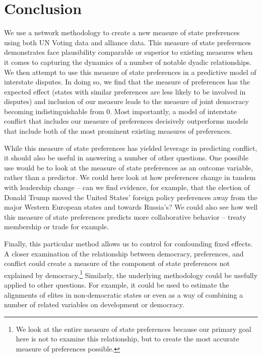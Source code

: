 \section*{Conclusion}

We use a network methodology to create a new measure of state preferences using both UN Voting data and alliance data. This measure of state preferences demonstrates face plausibility comparable or superior to existing measures when it comes to capturing the dynamics of a number of notable dyadic relationships. We then attempt to use this measure of state preferences in a predictive model of interstate disputes. In doing so, we find that the measure of preferences has the expected effect (states with similar preferences are less likely to be involved in disputes) and inclusion of our measure leads to the measure of joint democracy becoming indistinguishable from $0$. Most importantly, a model of interstate conflict that includes our measure of preferences decisively outperforms models that include both of the most prominent existing measures of preferences.

While this measure of state preferences has yielded leverage in predicting conflict, it should also be useful in answering a number of other questions. One possible use would be to look at the measure of state preferences as an outcome variable, rather than a predictor. We could here look at how preferences change in tandem with leadership change -- can we find evidence, for example, that the election of Donald Trump moved the United States' foreign policy preferences away from the major Western European states and towards Russia's? We could also see how well this measure of state preferences predicts more collaborative behavior -- treaty membership or trade for example.

Finally, this particular method allows us to control for confounding fixed effects. A closer examination of the relationship between democracy, preferences, and conflict could create a measure of the component of state preferences not explained by democracy.\footnote{We look at the entire measure of state preferences because our primary goal here is not to examine this relationship, but to create the most accurate measure of preferences possible.}  Similarly, the underlying methodology could be usefully applied to other questions. For example, it could be used to estimate the alignments of elites in non-democratic states  or even as a way of combining a number of related variables on development or democracy. 

